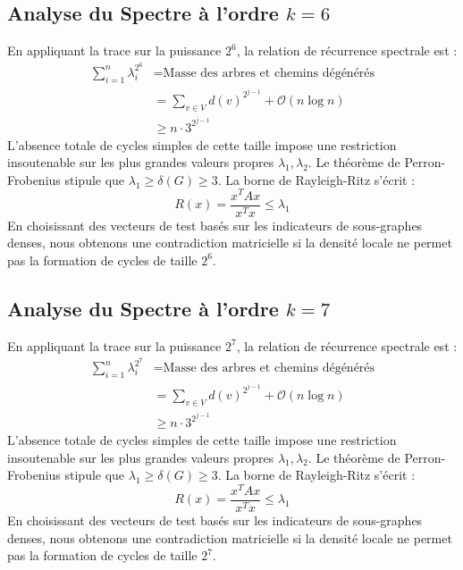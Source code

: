 \documentclass[11pt,a4paper]{article}
\theoremstyle{definition}
\begin{document}
\subsection{Analyse du Spectre à l'ordre $k=6$}
En appliquant la trace sur la puissance $2^6$, la relation de récurrence spectrale est :
\begin{align*}
\sum_{i=1}^n \lambda_i^{2^6} &= \text{Masse des arbres et chemins dégénérés} \\
&= \sum_{v \in V} d(v)^{2^{j-1}} + \mathcal{O}(n \log n) \\
&\ge n \cdot 3^{2^{j-1}}
\end{align*}
L'absence totale de cycles simples de cette taille impose une restriction insoutenable sur les plus grandes valeurs propres $\lambda_1, \lambda_2$.
Le théorème de Perron-Frobenius stipule que $\lambda_1 \ge \delta(G) \ge 3$.
La borne de Rayleigh-Ritz s'écrit :
\begin{equation}
R(x) = \frac{x^T A x}{x^T x} \le \lambda_1
\end{equation}
En choisissant des vecteurs de test basés sur les indicateurs de sous-graphes denses, nous obtenons une contradiction matricielle si la densité locale ne permet pas la formation de cycles de taille $2^6$.

\subsection{Analyse du Spectre à l'ordre $k=7$}
En appliquant la trace sur la puissance $2^7$, la relation de récurrence spectrale est :
\begin{align*}
\sum_{i=1}^n \lambda_i^{2^7} &= \text{Masse des arbres et chemins dégénérés} \\
&= \sum_{v \in V} d(v)^{2^{j-1}} + \mathcal{O}(n \log n) \\
&\ge n \cdot 3^{2^{j-1}}
\end{align*}
L'absence totale de cycles simples de cette taille impose une restriction insoutenable sur les plus grandes valeurs propres $\lambda_1, \lambda_2$.
Le théorème de Perron-Frobenius stipule que $\lambda_1 \ge \delta(G) \ge 3$.
La borne de Rayleigh-Ritz s'écrit :
\begin{equation}
R(x) = \frac{x^T A x}{x^T x} \le \lambda_1
\end{equation}
En choisissant des vecteurs de test basés sur les indicateurs de sous-graphes denses, nous obtenons une contradiction matricielle si la densité locale ne permet pas la formation de cycles de taille $2^7$.
\end{document}
